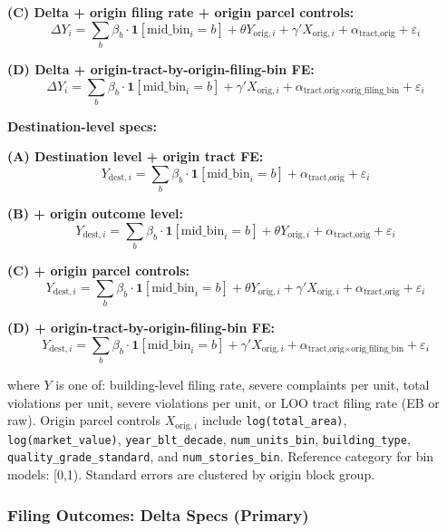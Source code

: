 \documentclass[
  11pt,
]{article}
\begin{document}
\textbf{(C) Delta + origin filing rate + origin parcel controls:} \[
\Delta Y_i = \sum_{b} \beta_b \cdot \mathbf{1}[\text{mid\_bin}_i = b]
 + \theta Y_{\text{orig},i}
 + \gamma' X_{\text{orig},i}
 + \alpha_{\text{tract,orig}} + \varepsilon_i
\]

\textbf{(D) Delta + origin-tract-by-origin-filing-bin FE:} \[
\Delta Y_i = \sum_{b} \beta_b \cdot \mathbf{1}[\text{mid\_bin}_i = b]
 + \gamma' X_{\text{orig},i}
 + \alpha_{\text{tract,orig} \times \text{orig\_filing\_bin}} + \varepsilon_i
\]

\textbf{Destination-level specs:}

\textbf{(A) Destination level + origin tract FE:} \[
Y_{\text{dest},i} = \sum_{b} \beta_b \cdot \mathbf{1}[\text{mid\_bin}_i = b] + \alpha_{\text{tract,orig}} + \varepsilon_i
\]

\textbf{(B) + origin outcome level:} \[
Y_{\text{dest},i} = \sum_{b} \beta_b \cdot \mathbf{1}[\text{mid\_bin}_i = b] + \theta Y_{\text{orig},i} + \alpha_{\text{tract,orig}} + \varepsilon_i
\]

\textbf{(C) + origin parcel controls:} \[
Y_{\text{dest},i} = \sum_{b} \beta_b \cdot \mathbf{1}[\text{mid\_bin}_i = b]
 + \theta Y_{\text{orig},i}
 + \gamma' X_{\text{orig},i}
 + \alpha_{\text{tract,orig}} + \varepsilon_i
\]

\textbf{(D) + origin-tract-by-origin-filing-bin FE:} \[
Y_{\text{dest},i} = \sum_{b} \beta_b \cdot \mathbf{1}[\text{mid\_bin}_i = b]
 + \gamma' X_{\text{orig},i}
 + \alpha_{\text{tract,orig} \times \text{orig\_filing\_bin}} + \varepsilon_i
\]

where \(Y\) is one of: building-level filing rate, severe complaints per
unit, total violations per unit, severe violations per unit, or LOO
tract filing rate (EB or raw). Origin parcel controls
\(X_{\text{orig},i}\) include \texttt{log(total\_area)},
\texttt{log(market\_value)}, \texttt{year\_blt\_decade},
\texttt{num\_units\_bin}, \texttt{building\_type},
\texttt{quality\_grade\_standard}, and \texttt{num\_stories\_bin}.
Reference category for bin models: {[}0,1). Standard errors are
clustered by origin block group.

\subsubsection{Filing Outcomes: Delta Specs
(Primary)}\label{filing-outcomes-delta-specs-primary}
\end{document}
